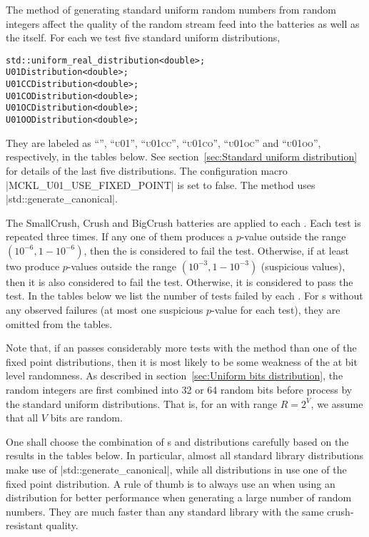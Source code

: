The method of generating standard uniform random numbers from random integers
affect the quality of the random stream feed into the \testu batteries as well
as the \rng itself. For each \rng we test five standard uniform distributions,
\begin{verbatim}
std::uniform_real_distribution<double>;
U01Distribution<double>;
U01CCDistribution<double>;
U01CODistribution<double>;
U01OCDistribution<double>;
U01OODistribution<double>;
\end{verbatim}
They are labeled as ``\std'', ``\textsc{u01}'', ``\textsc{u01cc}'',
``\textsc{u01co}'', ``\textsc{u01oc}'' and ``\textsc{u01oo}'', respectively, in
the tables below. See section~\ref{sec:Standard uniform distribution} for
details of the last five distributions. The configuration macro
|MCKL_U01_USE_FIXED_POINT| is set to false. The \std method uses
|std::generate_canonical|.

The SmallCrush, Crush and BigCrush batteries are applied to each \rng. Each
test is repeated three times. If any one of them produces a $p$-value outside
the range $(10^{-6}, 1 - 10^{-6})$, then the \rng is considered to fail the
test. Otherwise, if at least two produce $p$-values outside the range
$(10^{-3}, 1 - 10^{-3})$ (suspicious values), then it is also considered to
fail the test. Otherwise, it is considered to pass the test. In the tables
below we list the number of tests failed by each \rng. For \rng{}s without any
observed failures (at most one suspicious $p$-value for each test), they are
omitted from the tables.

Note that, if an \rng passes considerably more tests with the \std method than
one of the fixed point distributions, then it is most likely to be some
weakness of the \rng at bit level randomness. As described in
section~\ref{sec:Uniform bits distribution}, the random integers are first
combined into 32 or 64 random bits before process by the standard uniform
distributions. That is, for an \rng with range $R = 2^V$, we assume that all
$V$ bits are random.

One shall choose the combination of \rng{}s and distributions carefully based
on the results in the tables below. In particular, almost all standard library
distributions make use of |std::generate_canonical|, while all distributions in
\mckl use one of the fixed point distribution. A rule of thumb is to always use
an \mckl \rng when using an \mckl distribution for better performance when
generating a large number of random numbers. They are much faster than any
standard library \rng with the same crush-resistant quality.

